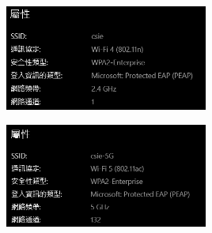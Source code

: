 \documentclass[12pt, a4paper]{article}
\begin{document}
\begin{enumerate}[label=(\alph*)]
    \includegraphics[width=0.5\textwidth]{4-b_csie.png}

    \includegraphics[width=0.5\textwidth]{4-b_csie-5G.png}
  \end{enumerate}
\end{document}
